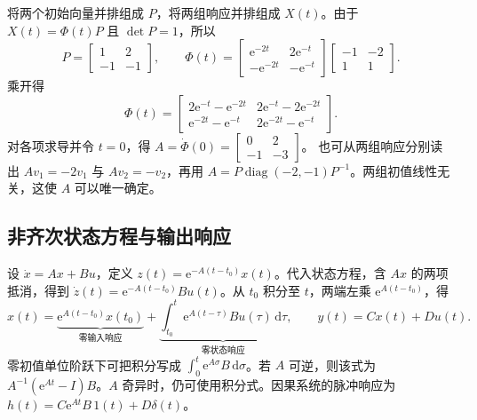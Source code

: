 \sol 将两个初始向量并排组成 $P$，将两组响应并排组成 $X(t)$。由于 $X(t)=\Phi(t)P$ 且 $\det P=1$，所以
\[
P=\begin{bmatrix}1&2\\-1&-1\end{bmatrix},\qquad
\Phi(t)=
\begin{bmatrix}\mathrm e^{-2t}&2\mathrm e^{-t}\\-\mathrm e^{-2t}&-\mathrm e^{-t}\end{bmatrix}
\begin{bmatrix}-1&-2\\1&1\end{bmatrix}.
\]
乘开得
\[
\Phi(t)=\begin{bmatrix}
2\mathrm e^{-t}-\mathrm e^{-2t} & 2\mathrm e^{-t}-2\mathrm e^{-2t}\\
\mathrm e^{-2t}-\mathrm e^{-t} & 2\mathrm e^{-2t}-\mathrm e^{-t}
\end{bmatrix}.
\]
对各项求导并令 $t=0$，得
$A=\dot\Phi(0)=\begin{bmatrix}0&2\\-1&-3\end{bmatrix}$。
也可从两组响应分别读出 $Av_1=-2v_1$ 与 $Av_2=-v_2$，再用 $A=P\operatorname{diag}(-2,-1)P^{-1}$。两组初值线性无关，这使 $A$ 可以唯一确定。

\subsection{非齐次状态方程与输出响应}

设 $\dot x=Ax+Bu$，定义 $z(t)=\mathrm e^{-A(t-t_0)}x(t)$。代入状态方程，含 $Ax$ 的两项抵消，得到 $\dot z(t)=\mathrm e^{-A(t-t_0)}Bu(t)$。从 $t_0$ 积分至 $t$，两端左乘 $\mathrm e^{A(t-t_0)}$，得
\[
x(t)=
\underbrace{\mathrm e^{A(t-t_0)}x(t_0)}_{\text{零输入响应}}+
\underbrace{\int_{t_0}^{t}\mathrm e^{A(t-\tau)}Bu(\tau)\,\mathrm d\tau}_{\text{零状态响应}},
\qquad y(t)=Cx(t)+Du(t).
\]
零初值单位阶跃下可把积分写成 $\int_0^t\mathrm e^{A\sigma}B\,\mathrm d\sigma$。若 $A$ 可逆，则该式为 $A^{-1}(\mathrm e^{At}-I)B$。$A$ 奇异时，仍可使用积分式。因果系统的脉冲响应为 $h(t)=C\mathrm e^{At}B\,1(t)+D\delta(t)$。


